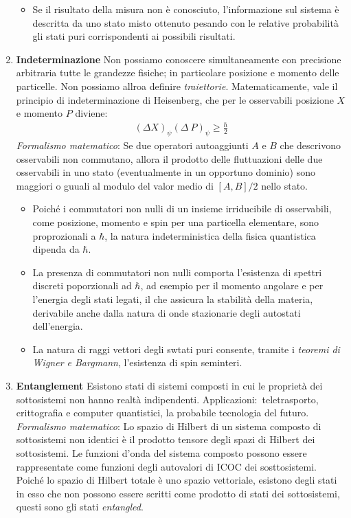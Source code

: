\documentclass[../../FisicaTeorica.tex]{subfiles}
\begin{document}
\begin{enumerate}
\begin{itemize}
\item Se il risultato della misura non è conosciuto, l'informazione sul sistema è descritta da uno stato misto ottenuto pesando con le relative probabilità gli stati puri corrispondenti ai possibili risultati.
\end{itemize}\item \textbf{Indeterminazione} Non possiamo conoscere simultaneamente con precisione arbitraria tutte le grandezze fisiche; in particolare posizione e momento delle particelle. Non possiamo allroa definire \textit{traiettorie}.
Matematicamente, vale il principio di indeterminazione di Heisenberg, che per le osservabili posizione $X$ e momento $P$ diviene:
\begin{align*}
(\Delta X)_\psi(\Delta\ P)_\psi \geq \frac{\hbar}{2}
\end{align*}
\textit{Formalismo matematico}: Se due operatori autoaggiunti $A$ e $B$ che descrivono osservabili non commutano, allora il prodotto delle fluttuazioni delle due osservabili in uno stato (eventualmente in un opportuno dominio) sono maggiori o guuali al modulo del valor medio di $[A,B]/2$ nello stato.
\begin{itemize}
\item Poiché i commutatori non nulli di un insieme irriducibile di osservabili, come posizione, momento e spin per una particella elementare, sono proprozionali a $\hbar$, la natura indeterministica della fisica quantistica dipenda da $\hbar$.
\item La presenza di commutatori non nulli comporta l'esistenza di spettri discreti poporzionali ad $\hbar$, ad esempio per il momento angolare e per l'energia degli stati legati, il che assicura la stabilità della materia, derivabile anche dalla natura di onde stazionarie degli autostati dell'energia.
\item La natura di raggi vettori degli swtati puri consente, tramite i \textit{teoremi di Wigner e Bargmann}, l'esistenza di spin seminteri. 
\end{itemize}
\item \textbf{Entanglement} Esistono stati di sistemi composti in cui le proprietà dei sottosistemi non hanno realtà indipendenti. Applicazioni:\ teletrasporto, crittografia e computer quantistici, la probabile tecnologia del futuro.\\
\textit{Formalismo matematico}: Lo spazio di Hilbert di un sistema composto di sottosistemi non identici è il prodotto tensore degli spazi di Hilbert dei sottosistemi. Le funzioni d'onda del sistema composto possono essere rappresentate come funzioni degli autovalori di ICOC dei sosttosistemi. Poiché lo spazio di Hilbert totale è uno spazio vettoriale, esistono degli stati in esso che non possono essere scritti come prodotto di stati dei sottosistemi, questi sono gli stati \textit{entangled}.

\end{enumerate}
\end{document}
